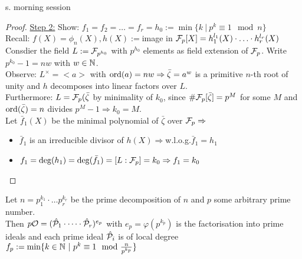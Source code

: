 
\setcounter{section}{10}
\setcounter{defi}{4}

\begin{Lem}
s. morning session
\end{Lem}

\begin{proof}
\underline{Step 2:} Show: $f_1=f_2= \dots=f_r=h_0:=\min \{ k \ | \ p^k \equiv 1 \mod n \}$\\
Recall: $f(X)= \phi_n(X), h(X):=$image in $\mathcal{F}_p[X]=h_1^{l_1}(X)\cdot \ldots \cdot h_r^{l_r}(X)$\\
Consdier the field $L:= \mathcal{F}_{p^{h_0}}$ with $p^{h_0}$ elements as field extension of $\mathcal{F}_p$.
Write $p^{k_0}-1= nw$ with $w \in \mathbb{N}$.\\
Observe: $L^\times = <a>$ with $\operatorname{ord}(a)=nw \Rightarrow \bar{\zeta}=a^w$ is a primitive $n$-th root of unity and $h$ decomposes into linear factors over $L$.\\
Furthermore: $L=\mathcal{F}_p(\bar{\zeta}$ by minimality of $k_0$, since $\# \mathcal{F}_p[\bar{\zeta}] = p^M$ for some $M$ and $\operatorname{ord}(\bar{\zeta})=n$ divides $p^M-1 \Rightarrow k_0=M$.\\
Let $\bar{f}_1(X)$ be the minimal polynomial of $\bar{\zeta}$ over $\mathcal{F}_p \Rightarrow$
\begin{itemize}
\item $\bar{f}_1$ is an irreducible divisor of $h(X) \Rightarrow $w.l.o.g.$ \bar{f}_1 = h_1$
\item $f_1=\deg(h_1)=\deg(\bar{f_1})=[L:\mathcal{F}_p]=k_0 \Rightarrow f_1=k_0$
\end{itemize} 
\end{proof}

\begin{Prop}
Let $n=p_1^{k_1} \cdot \ldots p_r^{k_r}$ be the prime decomposition of $n$ and $p$ some arbitrary prime number.\\
Then $p \mathcal{O}=(\hat{\mathcal{P}}_1 \cdot \dots \cdot \hat{\mathcal{P}}_r)^{e_p}$ with $e_p=\varphi(p^{k_p})$ is the factorisation into prime ideals and each prime ideal $\hat{\mathcal{P}}_i$ is of local degree $f_p:=\min\{k \in \mathbb{N} \ | \ p^k \equiv 1 \mod \frac{n}{p^{k_p}}\}$
\end{Prop}

